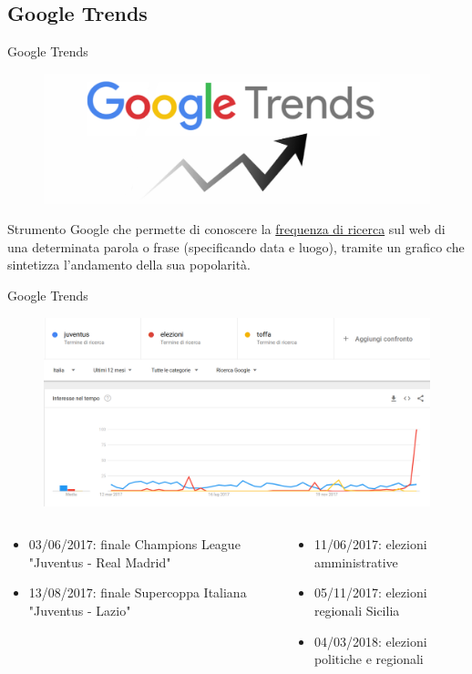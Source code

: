 \documentclass{beamer}
\begin{document}
\subsection{Google Trends}
\begin{frame}{Google Trends}
\begin{figure}[h!]
\includegraphics[width=0.5\linewidth]{immagini/trends.png}
\end{figure}
\medskip Strumento Google che permette di conoscere la \underline{frequenza di ricerca} sul web di una determinata parola o frase (specificando data e luogo), tramite un grafico che sintetizza l'andamento della sua popolarità.
\end{frame}
\begin{frame}{Google Trends}
\begin{figure}[h!]
\includegraphics[width=0.85\linewidth]{immagini/trend.png}
\end{figure}
\footnotesize
\begin{columns}
\begin{column}{0.5\linewidth}
\begin{itemize}
\item 03/06/2017: finale Champions League "Juventus - Real Madrid"
\item 13/08/2017: finale Supercoppa Italiana "Juventus - Lazio"
\end{itemize}
\end{column}
\begin{column}{0.5\linewidth}
\begin{itemize}
\item 11/06/2017: elezioni amministrative
\item 05/11/2017: elezioni regionali Sicilia
\item 04/03/2018: elezioni politiche e regionali
\end{itemize}
\end{column}
\end{columns}
\end{frame}
\end{document}

